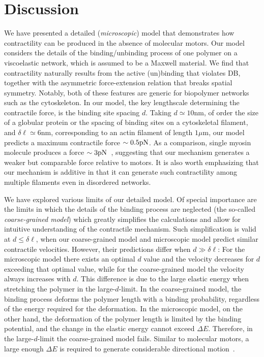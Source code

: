 \documentclass[twocolumn,prl,english]{revtex4-1}
\begin{document}
\section{Discussion}
\label{s5}
We have presented a detailed ({\it microscopic}) model that demonstrates how contractility can be produced in the absence of molecular motors. Our model considers the details of the binding/unbinding process of one polymer on a viscoelastic network, which is assumed to be a Maxwell material. We find that contractility naturally results from the active (un)binding that violates DB, together with the asymmetric force-extension relation that breaks spatial symmetry. Notably, both of these features are generic for biopolymer networks such as the cytoskeleton. In our model, the key lengthscale determining the contractile force, is the binding site spacing $d$. Taking $d\simeq10$nm, of order the size of a globular protein or the spacing of binding sites on a cytoskeletal filament, and $\delta\ell\simeq6$nm, corresponding to an actin filament of length $1\mu$m, our model predicts a maximum contractile force $\sim0.5 \rm pN$. As a comparison, single myosin molecule produces a force $\sim3 \rm pN$~\cite{Finer1994}, suggesting that our mechanism generates a weaker but comparable force relative to motors.  It is also worth emphasizing that our mechanism is additive in that it can generate such contractility among multiple filaments even in disordered networks. 

We have explored various limits of our detailed model. Of special importance are the limits in which the details of the binding process are neglected (the so-called {\it coarse-grained model}) which greatly simplifies the calculations and allow for intuitive understanding of the contractile mechanism. Such simplification is valid at $d\leq \delta \ell$, when  our coarse-grained model and microscopic model predict similar contractile velocities. However, their predictions differ when $d\gg\delta \ell$: For the microscopic model there exists an optimal $d$ value and the velocity decreases for $d$ exceeding that optimal value, while for the coarse-grained model the velocity always increases with $d$. This difference is due to the large elastic energy when stretching the polymer in the large-$d$-limit. In the coarse-grained model, the binding process deforms the polymer length with a binding probability, regardless of the energy required for the deformation. In the microscopic model, on the other hand, the deformation of the polymer length is limited by the binding potential, and the change in the elastic energy cannot exceed $\Delta E$. Therefore, in the large-$d$-limit the coarse-grained model fails. Similar to molecular motors, a large enough $\Delta E$ is required to generate considerable directional motion~\cite{Julicher1997}. 
\end{document}
